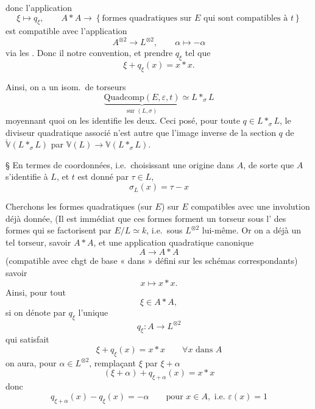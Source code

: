 \documentclass[11pt,a4paper]{article}
\begin{document}
donc l'application
\[
  \xi \longmapsto q_\xi, \qquad A \ast A \longrightarrow
  \left\{\text{formes quadratiques sur } E \text{ qui sont compatibles à } t\right\}
\]
est compatible avec l'application
\[
  A^{\otimes 2} \longrightarrow L^{\otimes 2}, \qquad \alpha \longmapsto -\alpha
\]
via les   . Donc il  \ill{} notre convention, et  prendre $q_\xi$ tel que
\[
  \xi + q_\xi(x) = x \ast x .
\]

Ainsi, on a un isom.\ de torseurs
\[
  \underbrace{\mathrm{Quadcomp}(E, \varepsilon, t)}_{\text{sur } (L,\sigma)} \simeq L \mathbin{\ast_\sigma} L
\]
moyennant quoi on les identifie les deux. Ceci posé, pour toute $q \in L \ast_\sigma L$, le diviseur quadratique associé n'est autre que l'image inverse de la section $q$ de $\check{\mathbb{V}}(L \ast_\sigma L)$ par $\mathbb{V}(L) \to \mathbb{V}(L \ast_\sigma L)$.

§ En termes de coordonnées, i.e.\ choisissant une origine dans $A$, de sorte que $A$ s'identifie à $L$, et $t$ est  donné par $\tau \in L$,
\[
  \sigma_L(x) = \tau - x
\]

Cherchons les formes quadratiques (sur $E$) sur $E$ compatibles avec une involution  déjà donnée, (Il est immédiat que ces formes forment un torseur sous l' des formes  qui se factorisent par $E/L \simeq k$, i.e.\ sous $L^{\otimes 2}$ lui-même. Or on a déjà un tel torseur, savoir $A \ast A$, et une application quadratique canonique
\[
  A \longrightarrow A \ast A
\]
(compatible avec chgt de base « dans » défini sur les schémas correspondants) savoir
\[
  x \longmapsto x \ast x .
\]
Ainsi, \struck{\ill{}} pour tout
\[
  \xi \in A \ast A,
\]
si on dénote par $q_\xi$ l'unique    
\[
  q_\xi : A \longrightarrow L^{\otimes 2}
\]
qui satisfait
\[
  \xi + q_\xi(x) = x \ast x \qquad \forall x \text{ dans } A
\]
on aura, pour $\alpha \in L^{\otimes 2}$, remplaçant $\xi$ par $\xi + \alpha$
\[
  (\xi + \alpha) + q_{\xi+\alpha}(x) = x \ast x
\]
donc
\[
  q_{\xi+\alpha}(x) - q_\xi(x) = -\alpha
  \qquad \text{pour } x \in A, \text{ i.e. } \varepsilon(x) = 1
\]
\end{document}
